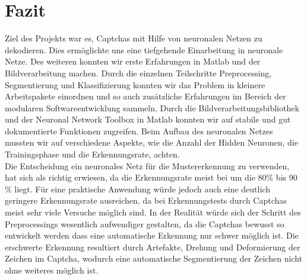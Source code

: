\section{Fazit}
Ziel des Projekts war es, Captchas mit Hilfe von neuronalen Netzen zu dekodieren. Dies ermöglichte uns eine tiefgehende Einarbeitung in neuronale Netze. Des weiteren konnten wir erste Erfahrungen in Matlab und der Bildverarbeitung machen. Durch die einzelnen Teilschritte Preprocessing, Segmentierung und Klassifizierung konnten wir das Problem in kleinere Arbeitspakete einordnen und so auch zusätzliche Erfahrungen im Bereich der modularen Softwareentwicklung sammeln. Durch die Bildverarbeitungsbibliothek und der Neuronal Network Toolbox in Matlab konnten wir auf stabile und gut dokumentierte Funktionen zugreifen. Beim Aufbau des neuronalen Netzes mussten wir auf verschiedene Aspekte, wie die Anzahl der Hidden Neuronen, die Trainingsphase und die Erkennungsrate, achten.\\
Die Entscheidung ein neuronales Netz für die Mustererkennung zu verwenden, hat sich als richtig erwiesen, da die Erkennungsrate meist bei um die 80\% bis 90 \% liegt. Für eine praktische Anwendung würde jedoch auch eine deutlich geringere Erkennungsrate ausreichen, da bei Erkennungstests durch Captchas meist sehr viele Versuche möglich sind. In der Realität würde sich der Schritt des Preprocessings wesentlich aufwendiger gestalten, da die Captchas bewusst so entwickelt werden dass eine automatische Erkennung nur schwer möglich ist. Die erschwerte Erkennung resultiert durch Artefakte, Drehung und Deformierung der Zeichen im Captcha, wodurch eine automatische Segmentierung der Zeichen nicht ohne weiteres möglich ist.
